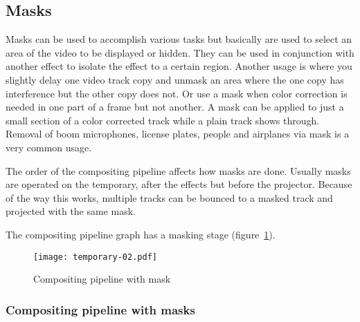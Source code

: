 \subsection{Masks}%
\label{sub:masks}

Masks can be used to accomplish various tasks but basically are used to select an area of the 
video to be displayed or hidden. 
They can be used in conjunction with another effect to isolate the effect to a certain region.
Another usage is where you slightly delay one video track copy and unmask an area where
the one copy has interference but the other copy does not.  Or use a mask when  color correction is
needed in one part of a frame but not another.  A mask can be applied to just a small section of
a color corrected track while a plain track shows through. 
Removal of boom microphones, license plates, people and airplanes via mask is a very common usage.

The order of the compositing pipeline affects how masks are done. Usually masks are operated on the
temporary, after the effects but before the projector. Because of the way this works, multiple
tracks can be bounced to a masked track and projected with the same mask.

The compositing pipeline graph has a masking stage (figure~\ref{fig:temporary-02}).

\begin{figure}[htpb]
    \centering
    \texttt{[image: temporary-02.pdf]}
    \caption{Compositing pipeline with mask}
    \label{fig:temporary-02}
\end{figure}

\subsubsection*{Compositing pipeline with masks}%
\label{ssub:compositing_pipeline_with_masks}

